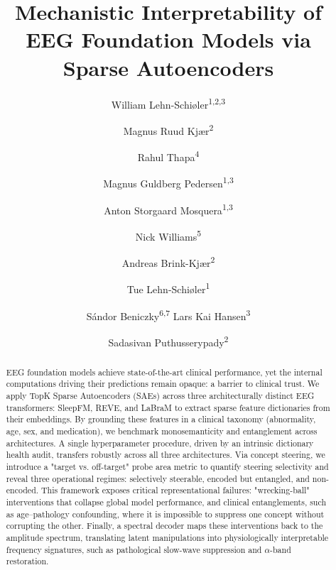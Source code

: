 \documentclass{article}
\title{Mechanistic Interpretability of \\ EEG Foundation Models via Sparse Autoencoders}
\author{%
  William Lehn-Schi\o ler\textsuperscript{1,2,3} \and
  Magnus Ruud Kj\ae r\textsuperscript{2} \and
  Rahul Thapa\textsuperscript{4} \and
  Magnus Guldberg Pedersen\textsuperscript{1,3} \and
  Anton Storgaard Mosquera\textsuperscript{1,3} \and
  Nick Williams\textsuperscript{5} \and
  Andreas Brink-Kj\ae r\textsuperscript{2} \and
  Tue Lehn-Schi\o ler\textsuperscript{1} \and
  S\'andor Beniczky\textsuperscript{6,7} \AND
  Lars Kai Hansen\textsuperscript{3} \and
  Sadasivan Puthusserypady\textsuperscript{2}
}
\begin{document}
\maketitle


\begin{abstract}
EEG foundation models achieve state-of-the-art clinical performance, yet the internal computations driving their predictions remain opaque: a barrier to clinical trust. We apply TopK Sparse Autoencoders (SAEs) across three architecturally distinct EEG transformers: SleepFM, REVE, and LaBraM to extract sparse feature dictionaries from their embeddings. By grounding these features in a clinical taxonomy (abnormality, age, sex, and medication), we benchmark monosemanticity and entanglement across architectures. A single hyperparameter procedure, driven by an intrinsic dictionary health audit, transfers robustly across all three architectures. Via concept steering, we introduce a "target vs. off-target" probe area metric to quantify steering selectivity and reveal three operational regimes: selectively steerable, encoded but entangled, and non-encoded. This framework exposes critical representational failures: "wrecking-ball" interventions that collapse global model performance, and clinical entanglements, such as age–pathology confounding, where it is impossible to suppress one concept without corrupting the other. Finally, a spectral decoder maps these interventions back to the amplitude spectrum, translating latent manipulations into physiologically interpretable frequency signatures, such as pathological slow-wave suppression and $\alpha$-band restoration.
\end{abstract}
\end{document}
